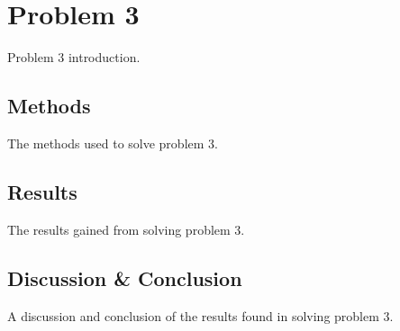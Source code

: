 \chapter{Problem 3}\label{ch:3-problem}

Problem 3 introduction.

\section{Methods}\label{sec:3-problem-method}

The methods used to solve problem 3.

\section{Results}\label{sec:3-problem-results}

The results gained from solving problem 3.

\section{Discussion \& Conclusion}\label{sec:3-problem-discussion-and-conclusion}

A discussion and conclusion of the results found in solving problem 3.